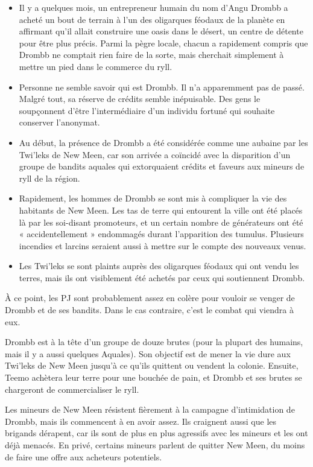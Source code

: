 \documentclass[a4paper,10pt,twoside,twocolumn,openany]{book}
\begin{document}
\begin{itemize}
\item  Il y a quelques mois, un entrepreneur humain du nom d’Angu Drombb a acheté un bout de terrain à l’un des oligarques féodaux de la planète en affirmant qu’il allait construire une oasis dans le désert, un centre de détente pour être plus précis. Parmi la pègre locale, chacun a rapidement compris que Drombb ne comptait rien faire de la sorte, mais cherchait simplement à mettre un pied dans le commerce du ryll.
\item  Personne ne semble savoir qui est Drombb. Il n’a apparemment pas de passé. Malgré tout, sa réserve de crédits semble inépuisable. Des gens le soupçonnent d’être l’intermédiaire d’un individu fortuné qui souhaite conserver l’anonymat.
\item  Au début, la présence de Drombb a été considérée comme une aubaine par les Twi’leks de New Meen, car son arrivée a coïncidé avec la disparition d’un groupe de bandits aquales qui extorquaient crédits et faveurs aux mineurs de ryll de la région. 
\item  Rapidement, les hommes de Drombb se sont mis à compliquer la vie des habitants de New Meen. Les tas de terre qui entourent la ville ont été placés là par les soi-disant promoteurs, et un certain nombre de générateurs ont été « accidentellement » endommagés durant l’apparition des tumulus. Plusieurs incendies et larcins seraient aussi à mettre sur le compte des nouveaux venus.
\item  Les Twi’leks se sont plaints auprès des oligarques féodaux qui ont vendu les terres, mais ils ont visiblement été achetés par ceux qui soutiennent Drombb.
\end{itemize}


À ce point, les PJ sont probablement assez en colère
pour vouloir se venger de Drombb et de ses bandits.
Dans le cas contraire, c’est le combat qui viendra à eux.

\subtitle{LE PLAN DE DROMBB}

Drombb est à la tête d’un groupe de douze brutes (pour la
plupart des humains, mais il y a aussi quelques Aquales).
Son objectif est de mener la vie dure aux Twi’leks de New
Meen jusqu’à ce qu’ils quittent ou vendent la colonie.
Ensuite, Teemo achètera leur terre pour une bouchée de
pain, et Drombb et ses brutes se chargeront de commercialiser le ryll.

Les mineurs de New Meen résistent fièrement à la
campagne d’intimidation de Drombb, mais ils commencent à en avoir assez. Ils craignent aussi que les
brigands dérapent, car ils sont de plus en plus agressifs
avec les mineurs et les ont déjà menacés. En privé, certains mineurs parlent de quitter New Meen, du moins de
faire une offre aux acheteurs potentiels.
\end{document}
